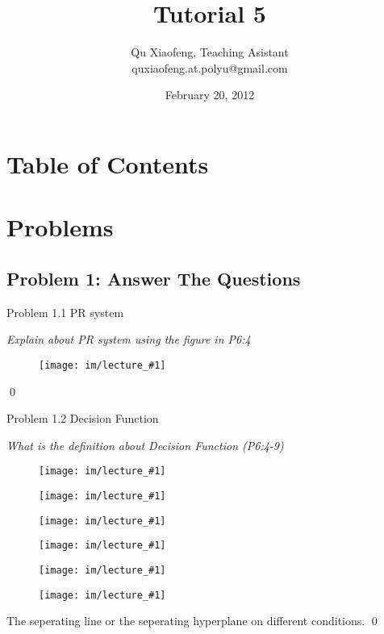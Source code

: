 \documentclass[
        ]{beamer}
\title{Tutorial 5}
\author[COMP435p]{Qu Xiaofeng\texorpdfstring{, Teaching Asistant\\\tiny{quxiaofeng.at.polyu@gmail.com}}{}}
\institute{COMP435p\\Biometrics Authentication}
\date{February 20, 2012}
\begin{document}
\newcommand{\inpdfu}[2]{\begin{figure}\centering\texttt{[image: im/lecture\_\#1]}\end{figure}}
\newcommand{\inpdfl}[2]{\begin{figure}\centering\texttt{[image: im/lecture\_\#1]}\end{figure}}
\newcommand{\inpng}[1]{\begin{figure}\centering\texttt{[image: im/\#1]}\end{figure}}

\frame{\titlepage}

\section*{Table of Contents}

    \begin{frame}{\secname}
        \tableofcontents
    \end{frame}




\section{Problems}

    \subsection{Problem 1: Answer The Questions}
    
    		\begin{frame}[t]{Problem 1.1 PR system}
    			\begin{overprint}
    			\emph{Explain about PR system using the figure in P6:4}
    				\onslide<2> \inpdfl{6}{2} %
							\qed		
    			\end{overprint}
    		\end{frame}
    
    		\begin{frame}[t]{Problem 1.2 Decision Function}
    			\begin{overprint}
    				\onslide<1>
    			\emph{What is the definition about Decision Function (P6:4-9)}
    				\onslide<2> \inpdfl{6}{2} %
    				 \inpdfu{6}{3} %
    				 \inpdfl{6}{3} %
    				 \inpdfu{6}{4} %
    				 \inpdfl{6}{4} %
    				 \inpdfu{6}{5} %
    				The seperating line or the seperating hyperplane on different conditions.		
							\qed		
    			\end{overprint}
    		\end{frame}
    
\end{document}
